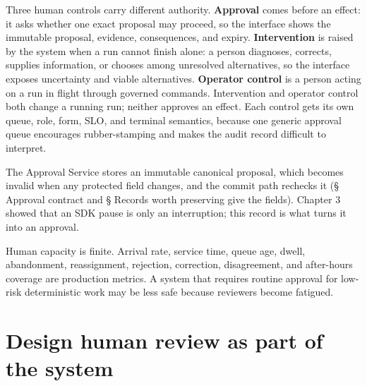 Three human controls carry different authority. \textbf{Approval} comes before an effect: it asks whether one exact proposal may proceed, so the interface shows the immutable proposal, evidence, consequences, and expiry. \textbf{Intervention} is raised by the system when a run cannot finish alone: a person diagnoses, corrects, supplies information, or chooses among unresolved alternatives, so the interface exposes uncertainty and viable alternatives. \textbf{Operator control} is a person acting on a run in flight through governed commands. Intervention and operator control both change a running run; neither approves an effect. Each control gets its own queue, role, form, SLO, and terminal semantics, because one generic approval queue encourages rubber-stamping and makes the audit record difficult to interpret.\par


The Approval Service stores an immutable canonical proposal, which becomes invalid when any protected field changes, and the commit path rechecks it (§ Approval contract and § Records worth preserving give the fields). Chapter 3 showed that an SDK pause is only an interruption; this record is what turns it into an approval.\par

Human capacity is finite. Arrival rate, service time, queue age, dwell, abandonment, reassignment, rejection, correction, disagreement, and after-hours coverage are production metrics. A system that requires routine approval for low-risk deterministic work may be less safe because reviewers become fatigued.\par

\section{Design human review as part of the system}

